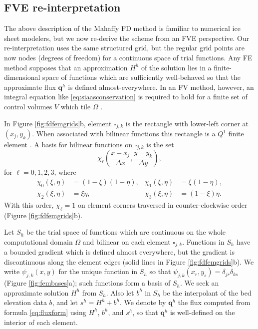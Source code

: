 \documentclass[review,letterpaper]{igs}
\newcommand\bq{\mathbf{q}}
\begin{document}
\subsection{FVE re-interpretation}

The above description of the Mahaffy FD method is familiar to numerical ice sheet modelers, but we now re-derive the scheme from an FVE perspective.  Our re-interpretation uses the same structured grid, but the regular grid points are now nodes (degrees of freedom) for a continuous space of trial functions.  Any FE method supposes that an approximation $H^h$ of the solution lies in a finite-dimensional space of functions which are sufficiently well-behaved so that the approximate flux $\bq^h$ is defined almost-everywhere.  In an FV method, however, an integral equation like \eqref{eq:siaasconservation} is required to hold for a finite set of control volumes $V$ which tile $\Omega$ \citep{LeVeque2002}.

In Figure \ref{fig:fdfemgrids}b, element $\square_{j,k}$ is the rectangle with lower-left corner at $(x_j,y_k)$.  When associated with bilinear functions this rectangle is a $Q^1$ finite element \citep{Elmanetal2005}.  A basis for bilinear functions on $\square_{j,k}$ is the set
\begin{equation}
\chi_\ell \left(\frac{x-x_j}{\Delta x},\frac{y-y_k}{\Delta y}\right), \label{eq:elementbasis}
\end{equation}
for $\ell=0,1,2,3$, where
\begin{align*}
\chi_0(\xi,\eta) &= \left(1-\xi\right) \left(1-\eta\right), & \chi_1(\xi,\eta) &= \xi \left(1-\eta\right), \\
\chi_2(\xi,\eta) &= \xi \eta, & \chi_3(\xi,\eta) &= \left(1-\xi\right) \eta.
\end{align*}
With this order, $\chi_\ell=1$ on element corners traversed in counter-clockwise order (Figure \ref{fig:fdfemgrids}b).  

Let $S_h$ be the trial space of functions which are continuous on the whole computational domain $\Omega$ and bilinear on each element $\square_{j,k}$.  Functions in $S_h$ have a bounded gradient which is defined almost everywhere, but the gradient is discontinuous along the element edges (solid lines in Figure \ref{fig:fdfemgrids}b).  We write $\psi_{j,k}(x,y)$ for the unique function in $S_h$ so that $\psi_{j,k}(x_r,y_s) = \delta_{jr} \delta_{ks}$ (Figure \ref{fig:fembases}a); such functions form a basis of $S_h$.  We seek an approximate solution $H^h$ from $S_h$.  Also let $b^h$ in $S_h$ be the interpolant of the bed elevation data $b$, and let $s^h=H^h+b^h$.  We denote by $\bq^h$ the flux computed from formula \eqref{eq:fluxform} using $H^h$, $b^h$, and $s^h$, so that $\bq^h$ is well-defined on the interior of each element.
\end{document}
